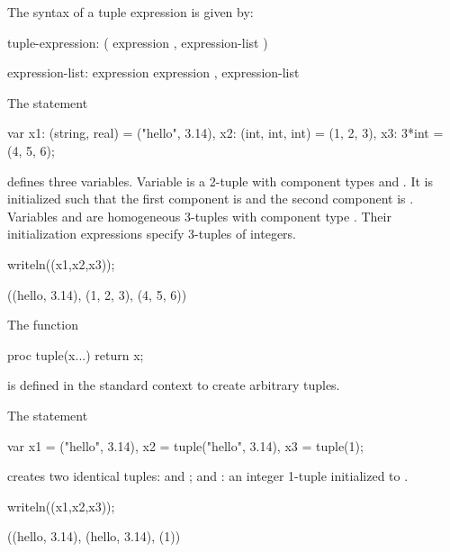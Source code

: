 The syntax of a tuple expression is given by:
\begin{syntax}
tuple-expression:
  ( expression , expression-list )

expression-list:
  expression
  expression , expression-list
\end{syntax}

\begin{example}
\begin{chapelpre}
\end{chapelpre}
The statement
\begin{chapel}
var x1: (string, real) = ("hello", 3.14),
    x2: (int, int, int) = (1, 2, 3),
    x3: 3*int = (4, 5, 6);
\end{chapel}
defines three variables.  Variable  is a 2-tuple with
component types  and .  It is initialized such
that the first component is  and the second
component is .  Variables  and  are
homogeneous 3-tuples with component type .  Their
initialization expressions specify 3-tuples of integers.
\begin{chapelpost}
writeln((x1,x2,x3));
\end{chapelpost}
\begin{chapeloutput}
((hello, 3.14), (1, 2, 3), (4, 5, 6))
\end{chapeloutput}
\end{example}

The function
\begin{chapel}
proc tuple(x...) return x;
\end{chapel}
is defined in the standard context to create arbitrary tuples.

\begin{example}
\begin{chapelpre}
\end{chapelpre}
The statement
\begin{chapel}
var x1 =      ("hello", 3.14),
    x2 = tuple("hello", 3.14),
    x3 = tuple(1);
\end{chapel}
creates two identical tuples:  and ; and : an integer 1-tuple
 initialized to .
\begin{chapelpost}
writeln((x1,x2,x3));
\end{chapelpost}
\begin{chapeloutput}
((hello, 3.14), (hello, 3.14), (1))
\end{chapeloutput}
\end{example}

